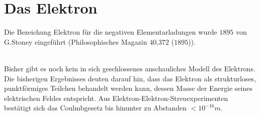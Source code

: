 \chapter{Das Elektron} %
\label{cha:Das_Elektron}
Die Bezeichung Elektron für die negativen Elementarladungen wurde $1895$ von
G.Stoney eingeführt (Philosophisches Magazin $40$,$372$ ($1895$)).




\\
Bisher gibt es noch kein in sich geschlossenes anschauliches Modell des
Elektrons. Die bisherigen Ergebnisses deuten darauf hin, dass das Elektron als
strukturloses, punktförmiges Teilchen behandelt werden kann, dessen Masse der
Energie seines elektrischen Feldes entspricht. Aus
Elektron-Elektron-Streuexperimenten bestätigt sich das Coulmbgesetz bis
hinunter zu Abstanden $< 10^{-16} m$.
